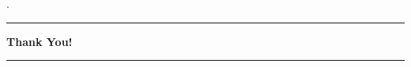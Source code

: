 \documentclass{beamer}
\begin{document}
\begin{frame}[t]{.}
    \centering
    \vspace{1cm}
    \textbf{\Huge{}}
    
    \vspace{0.5cm}
    \rule{0.5\textwidth}{0.5mm} %

    \vspace{1cm}
    \textbf{\Large{Thank You!}}

    \vspace{0.5cm}
    \rule{0.5\textwidth}{0.5mm} %
\end{frame}
\end{document}
